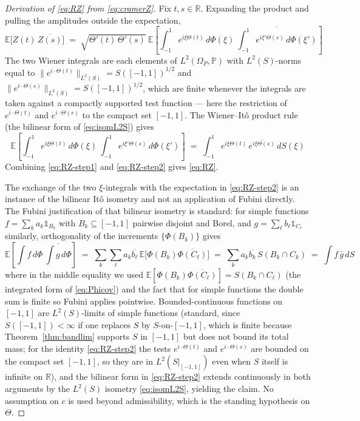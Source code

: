 \documentclass[11pt]{article}
\begin{document}
\begin{proof}[Derivation of \eqref{eq:RZ} from \eqref{eq:cramerZ}]
Fix $t,s\in\mathbb{R}$. Expanding the product and pulling the amplitudes outside the expectation,
\begin{equation}\label{eq:RZ-step1}
\mathbb{E}\bigl[Z(t)\,\overline{Z(s)}\bigr] \;=\; \sqrt{\Theta'(t)\,\Theta'(s)}\ \mathbb{E}\!\left[\int_{-1}^{1} e^{i\xi\Theta(t)}\,d\Phi(\xi)\ \overline{\int_{-1}^{1}e^{i\xi'\Theta(s)}\,d\Phi(\xi')}\right]
\end{equation}
The two Wiener integrals are each elements of $L^2(\Omega_P,\mathbb{P})$ with $L^2(S)$-norms equal to $\|e^{i\cdot\Theta(t)}\|_{L^2(S)}=S([-1,1])^{1/2}$ and $\|e^{i\cdot\Theta(s)}\|_{L^2(S)}=S([-1,1])^{1/2}$, which are finite whenever the integrals are taken against a compactly supported test function --- here the restriction of $e^{i\cdot\Theta(t)}$ and $e^{i\cdot\Theta(s)}$ to the compact set $[-1,1]$. The Wiener--It\^o product rule (the bilinear form of \eqref{eq:isomL2S}) gives
\begin{equation}\label{eq:RZ-step2}
\mathbb{E}\!\left[\int_{-1}^{1} e^{i\xi\Theta(t)}\,d\Phi(\xi)\ \overline{\int_{-1}^{1}e^{i\xi'\Theta(s)}\,d\Phi(\xi')}\right] \;=\; \int_{-1}^{1} e^{i\xi\Theta(t)}\,\overline{e^{i\xi\Theta(s)}}\,dS(\xi)
\end{equation}
Combining \eqref{eq:RZ-step1} and \eqref{eq:RZ-step2} gives \eqref{eq:RZ}.

The exchange of the two $\xi$-integrals with the expectation in \eqref{eq:RZ-step2} is an instance of the bilinear It\^o isometry and not an application of Fubini directly. The Fubini justification of that bilinear isometry is standard: for simple functions $f=\sum_k a_k\mathbb{1}_{B_k}$ with $B_k\subseteq[-1,1]$ pairwise disjoint and Borel, and $g=\sum_\ell b_\ell\mathbb{1}_{C_\ell}$ similarly, orthogonality of the increments $\{\Phi(B_k)\}$ gives
\begin{equation}\label{eq:RZ-step3}
\mathbb{E}\!\left[\int f\,d\Phi\ \overline{\int g\,d\Phi}\right] \;=\; \sum_{k}\!\sum_\ell a_k\overline{b_\ell}\,\mathbb{E}\bigl[\Phi(B_k)\overline{\Phi(C_\ell)}\bigr] \;=\; \sum_k a_k\overline{b_k}\,S(B_k\cap C_k) \;=\; \int f\,\bar g\,dS
\end{equation}
where in the middle equality we used $\mathbb{E}[\Phi(B_k)\overline{\Phi(C_\ell)}]=S(B_k\cap C_\ell)$ (the integrated form of \eqref{eq:Phicov}) and the fact that for simple functions the double sum is finite so Fubini applies pointwise. Bounded-continuous functions on $[-1,1]$ are $L^2(S)$-limits of simple functions (standard, since $S([-1,1])<\infty$ if one replaces $S$ by $S$-on-$[-1,1]$, which is finite because Theorem~\ref{thm:bandlim} supports $S$ in $[-1,1]$ but does not bound its total mass; for the identity \eqref{eq:RZ-step2} the tests $e^{i\cdot\Theta(t)}$ and $e^{i\cdot\Theta(s)}$ are bounded on the compact set $[-1,1]$, so they are in $L^2(S|_{[-1,1]})$ even when $S$ itself is infinite on $\mathbb{R}$), and the bilinear form in \eqref{eq:RZ-step2} extends continuously in both arguments by the $L^2(S)$ isometry \eqref{eq:isomL2S}, yielding the claim. No assumption on $c$ is used beyond admissibility, which is the standing hypothesis on $\Theta$.


\end{proof}
\end{document}
